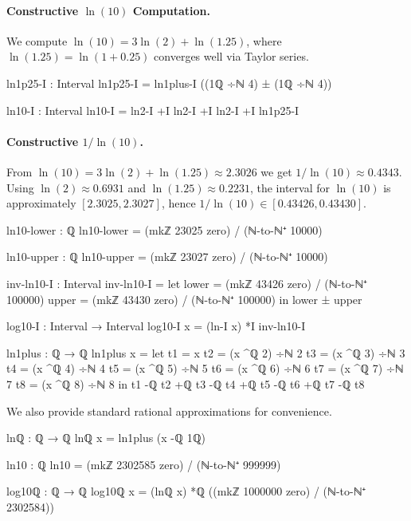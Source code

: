 \documentclass[11pt,a4paper]{book}
\begin{document}
\paragraph{Constructive $\ln(10)$ Computation.}
We compute $\ln(10) = 3\ln(2) + \ln(1.25)$, where $\ln(1.25) = \ln(1 + 0.25)$ 
converges well via Taylor series.

\begin{code}
ln1p25-I : Interval
ln1p25-I = ln1plus-I ((1ℚ ÷ℕ 4) ± (1ℚ ÷ℕ 4))

ln10-I : Interval
ln10-I = ln2-I +I ln2-I +I ln2-I +I ln1p25-I

\end{code}

\paragraph{Constructive $1/\ln(10)$.}
From $\ln(10) = 3\ln(2) + \ln(1.25) \approx 2.3026$ we get $1/\ln(10) \approx 0.4343$.
Using $\ln(2) \approx 0.6931$ and $\ln(1.25) \approx 0.2231$, the interval for 
$\ln(10)$ is approximately $[2.3025, 2.3027]$, hence $1/\ln(10) \in [0.43426, 0.43430]$.

\begin{code}
ln10-lower : ℚ
ln10-lower = (mkℤ 23025 zero) / (ℕ-to-ℕ⁺ 10000)

ln10-upper : ℚ
ln10-upper = (mkℤ 23027 zero) / (ℕ-to-ℕ⁺ 10000)

inv-ln10-I : Interval
inv-ln10-I = 
  let lower = (mkℤ 43426 zero) / (ℕ-to-ℕ⁺ 100000)
      upper = (mkℤ 43430 zero) / (ℕ-to-ℕ⁺ 100000)
  in lower ± upper

log10-I : Interval → Interval
log10-I x = (ln-I x) *I inv-ln10-I

ln1plus : ℚ → ℚ
ln1plus x = 
  let t1 = x
      t2 = (x ^ℚ 2) ÷ℕ 2
      t3 = (x ^ℚ 3) ÷ℕ 3
      t4 = (x ^ℚ 4) ÷ℕ 4
      t5 = (x ^ℚ 5) ÷ℕ 5
      t6 = (x ^ℚ 6) ÷ℕ 6
      t7 = (x ^ℚ 7) ÷ℕ 7
      t8 = (x ^ℚ 8) ÷ℕ 8
  in t1 -ℚ t2 +ℚ t3 -ℚ t4 +ℚ t5 -ℚ t6 +ℚ t7 -ℚ t8

\end{code}

We also provide standard rational approximations for convenience.

\begin{code}
lnℚ : ℚ → ℚ
lnℚ x = ln1plus (x -ℚ 1ℚ)

ln10 : ℚ
ln10 = (mkℤ 2302585 zero) / (ℕ-to-ℕ⁺ 999999)

log10ℚ : ℚ → ℚ
log10ℚ x = (lnℚ x) *ℚ ((mkℤ 1000000 zero) / (ℕ-to-ℕ⁺ 2302584))

\end{code}
\end{document}
